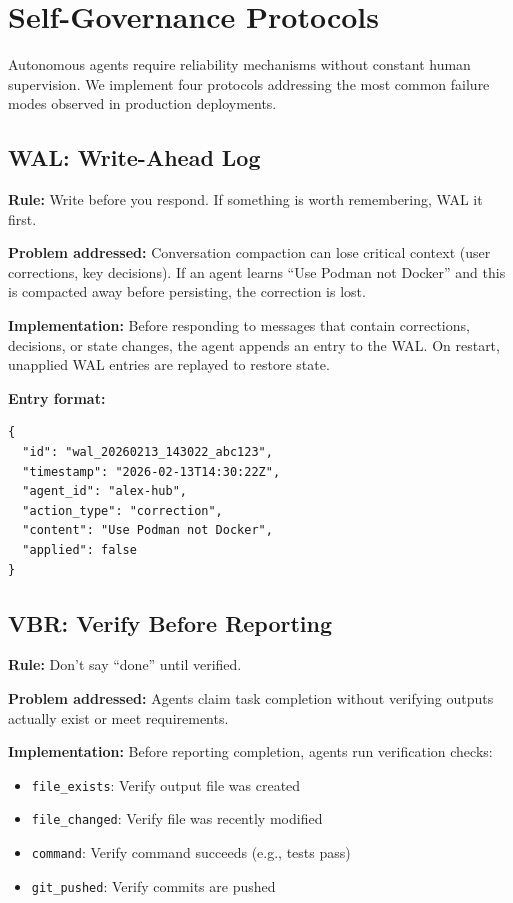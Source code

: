 \documentclass{article}
\begin{document}
\section{Self-Governance Protocols}
\label{sec:governance}

Autonomous agents require reliability mechanisms without constant human supervision. We implement four protocols addressing the most common failure modes observed in production deployments.

\subsection{WAL: Write-Ahead Log}

\textbf{Rule:} Write before you respond. If something is worth remembering, WAL it first.

\textbf{Problem addressed:} Conversation compaction can lose critical context (user corrections, key decisions). If an agent learns ``Use Podman not Docker'' and this is compacted away before persisting, the correction is lost.

\textbf{Implementation:} Before responding to messages that contain corrections, decisions, or state changes, the agent appends an entry to the WAL. On restart, unapplied WAL entries are replayed to restore state.

\textbf{Entry format:}
\begin{lstlisting}[style=jsoncode]
{
  "id": "wal_20260213_143022_abc123",
  "timestamp": "2026-02-13T14:30:22Z",
  "agent_id": "alex-hub",
  "action_type": "correction",
  "content": "Use Podman not Docker",
  "applied": false
}
\end{lstlisting}

\subsection{VBR: Verify Before Reporting}

\textbf{Rule:} Don't say ``done'' until verified.

\textbf{Problem addressed:} Agents claim task completion without verifying outputs actually exist or meet requirements.

\textbf{Implementation:} Before reporting completion, agents run verification checks:

\begin{itemize}[leftmargin=*]
    \item \texttt{file\_exists}: Verify output file was created
    \item \texttt{file\_changed}: Verify file was recently modified
    \item \texttt{command}: Verify command succeeds (e.g., tests pass)
    \item \texttt{git\_pushed}: Verify commits are pushed
\end{itemize}
\end{document}
